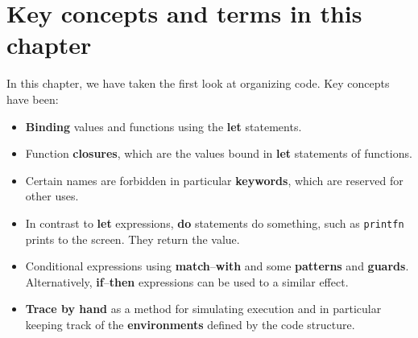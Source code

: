 \documentclass[fsharpNotes.tex]{subfiles}
\begin{document}
\section{Key concepts and terms in this chapter}
In this chapter, we have taken the first look at organizing code. Key concepts have been:
\begin{itemize}
\item \textbf{Binding} values and functions using the \textbf{let} statements.
\item Function \textbf{closures}, which are the values bound in \textbf{let} statements of functions.
\item Certain names are forbidden in particular \textbf{keywords}, which are reserved for other uses. 
\item In contrast to \textbf{let} expressions, \textbf{do} statements do something, such as \lstinline{printfn} prints to the screen. They return the \lexeme{()} value.
\item Conditional expressions using \textbf{match}--\textbf{with} and some \textbf{patterns} and \textbf{guards}. Alternatively, \textbf{if}--\textbf{then} expressions can be used to a similar effect.
\item \textbf{Trace by hand} as a method for simulating execution and in particular keeping track of the \textbf{environments} defined by the code structure.
\end{itemize}
\end{document}
